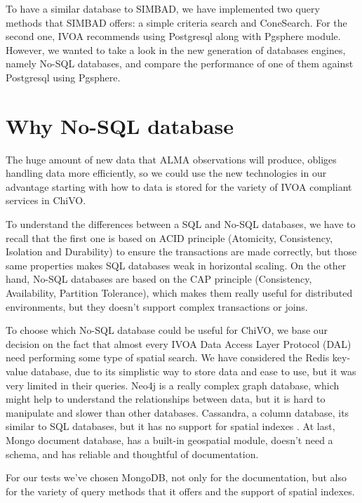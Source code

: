 \documentclass[11pt,twoside]{article}
\begin{document}
To have a similar database to SIMBAD, we have implemented two query methods that
SIMBAD offers: a simple criteria search and ConeSearch. For the second one, 
IVOA recommends using Postgresql along with Pgsphere module. 
However, we wanted to take a look in the new generation of databases engines, namely No-SQL databases, and compare the
performance of one of them against Postgresql using Pgsphere.


\section{Why No-SQL database}
    The huge amount of new data that ALMA observations will produce, obliges
    handling data more efficiently, so we could use the new technologies 
    in our advantage starting with how to data is stored for the variety
    of IVOA compliant services in ChiVO.
    
    To understand the differences between a SQL and No-SQL databases, we have
    to recall that the first one is based on ACID principle 
    (Atomicity, Consistency, Isolation and Durability) to ensure the
    transactions are made correctly, but those same properties
    makes SQL databases weak in horizontal scaling. On the other hand, No-SQL
    databases are based on the CAP principle (Consistency, Availability, Partition
    Tolerance), which makes them really useful for distributed environments, but 
    they doesn't support complex transactions or joins.

    To choose which No-SQL database could be useful for ChiVO, we base our
    decision on the fact that almost every
    IVOA Data Access Layer Protocol (DAL) need performing some type of spatial
    search. We have considered the Redis key-value database, due to its
    simplistic way to store data and ease to use, but it was very limited in
    their queries. Neo4j is a really complex graph database, which might help to
    understand the relationships between data, but it is hard to manipulate and slower 
    than other databases. Cassandra, a column database, its similar
    to SQL databases, but it has no support for spatial indexes %
    . At last, Mongo document database, 
    has a built-in geospatial module, doesn't need a schema, and has reliable
    and thoughtful of documentation.

    For our tests we've chosen MongoDB, not only for the documentation, but also
    for the variety of query methods that it offers and the support of spatial indexes.
\end{document}
